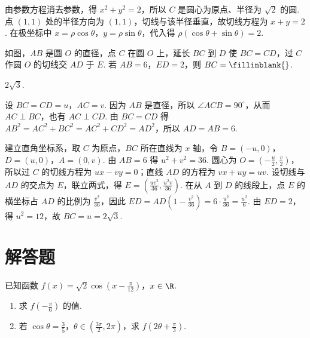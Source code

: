 \begin{solution}
由参数方程消去参数，得 \(x^2+y^2=2\)，所以 \(C\) 是圆心为原点、半径为 \(\sqrt2\) 的圆. 点 \((1,1)\) 处的半径方向为 \((1,1)\)，切线与该半径垂直，故切线方程为 \(x+y=2\). 在极坐标中 \(x=\rho\cos\theta\)，\(y=\rho\sin\theta\)，代入得 \(\rho(\cos\theta+\sin\theta)=2\).
\end{solution}

\begin{problem}
如图，\(AB\) 是圆 \(O\) 的直径，点 \(C\) 在圆 \(O\) 上，延长 \(BC\) 到 \(D\) 使 \(BC = CD\)，过 \(C\) 作圆 \(O\) 的切线交 \(AD\) 于 \(E\). 若 \(AB = 6\)，\(ED = 2\)，则 \(BC =\fillinblank{}\).
\end{problem}

\begin{answer}
\(2\sqrt{3}\).
\end{answer}

\begin{solution}
设 \(BC=CD=u\)，\(AC=v\). 因为 \(AB\) 是直径，所以 \(\angle ACB=90^{\circ}\)，从而 \(AC\perp BC\)，也有 \(AC\perp CD\). 由 \(BC=CD\) 得 \(AB^2=AC^2+BC^2=AC^2+CD^2=AD^2\)，所以 \(AD=AB=6\).

建立直角坐标系，取 \(C\) 为原点，\(BC\) 所在直线为 \(x\) 轴，令 \(B=(-u,0)\)，\(D=(u,0)\)，\(A=(0,v)\). 由 \(AB=6\) 得 \(u^2+v^2=36\). 圆心为 \(O=(-\frac u2,\frac v2)\)，所以过 \(C\) 的切线方程为 \(ux-vy=0\)；直线 \(AD\) 的方程为 \(vx+uy=uv\). 设切线与 \(AD\) 的交点为 \(E\)，联立两式，得
\(E=\left(\frac{uv^2}{36},\frac{u^2v}{36}\right)\). 在从 \(A\) 到 \(D\) 的线段上，点 \(E\) 的横坐标占 \(AD\) 的比例为 \(\frac{v^2}{36}\)，因此
\(ED=AD\left(1-\frac{v^2}{36}\right)=6\cdot\frac{u^2}{36}=\frac{u^2}{6}\). 由 \(ED=2\)，得 \(u^2=12\)，故 \(BC=u=2\sqrt3\).
\end{solution}

\section{解答题}

\begin{problem}
已知函数 \(f(x) = \sqrt{2}\cos\left(x - \frac{\pi}{12}\right)\)，\(x \in \R\).

\begin{enumerate}
\item 求 \(f\left(-\frac{\pi}{6}\right)\) 的值.
\item 若 \(\cos \theta = \frac{3}{5}\)，\(\theta \in \left(\frac{3\pi}{2}, 2\pi\right)\)，求 \(f\left(2\theta + \frac{\pi}{3}\right)\).
\end{enumerate}
\end{problem}

